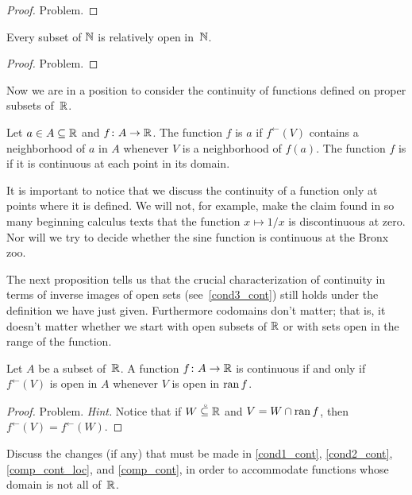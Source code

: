 \begin{proof} Problem. \ns \end{proof}

\begin{exam}Every subset of $\mathbb{N}$ is relatively open in~$\mathbb{N}$.
\end{exam}

\begin{proof} Problem. \ns \end{proof}

Now we are in a position to consider the continuity of functions defined on proper subsets
of~$\mathbb{R}$.

\begin{defn} Let $a \in A \subseteq \mathbb{R}$ and $f\colon A \rightarrow \mathbb{R}$.  The function $f$ is
 $a$ if $f^\gets(V)$ contains a neighborhood of $a$ in $A$ whenever $V$ is a
neighborhood of $f(a)$. The function $f$ is
 if it is continuous at each point in its domain.
\end{defn}

It is important to notice that we discuss the continuity of a function only at points where it
is defined.  We will not, for example, make the claim found in so many beginning calculus
texts that the function $x \mapsto 1/x$ is discontinuous at zero. Nor will we try to decide
whether the sine function is continuous at the Bronx zoo.

The next proposition tells us that the crucial characterization of continuity in terms of
inverse images of open sets (see~\ref{cond3_cont}) still holds under the definition we have
just given.  Furthermore codomains don't matter; that is, it doesn't matter whether we start
with open subsets of $\mathbb{R}$ or with sets open in the range of the function.

\begin{prop}\label{cond3a_cont} Let $A$ be a subset of~$\mathbb{R}$.  A function $f\colon A \rightarrow \mathbb{R}$
is continuous if and only if $f^\gets(V)$ is open in $A$ whenever $V$ is open in $\operatorname{ran} f$.
\end{prop}

\begin{proof} Problem.  \emph{Hint.} Notice that if $W\overset{\thickspace{}_\circ}{\subseteq}\mathbb{R}$ and $V = W \cap \operatorname{ran} f$,
then $f^\gets(V) = f^\gets(W)$.  \ns
\end{proof}

\begin{prob}\label{cont_rel} Discuss the changes (if any) that must be made in \ref{cond1_cont},
\ref{cond2_cont}, \ref{comp_cont_loc}, and \ref{comp_cont}, in order to accommodate functions
whose domain is not all of~$\mathbb{R}$.
\end{prob}

